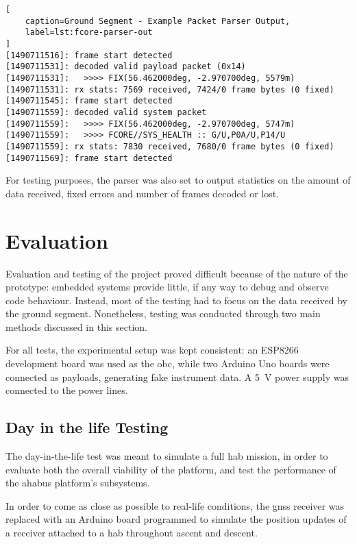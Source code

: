 \begin{lstlisting}[
    caption=Ground Segment - Example Packet Parser Output,
    label=lst:fcore-parser-out
]
[1490711516]: frame start detected
[1490711531]: decoded valid payload packet (0x14)
[1490711531]: 	>>>> FIX(56.462000deg, -2.970700deg, 5579m)
[1490711531]: rx stats: 7569 received, 7424/0 frame bytes (0 fixed)
[1490711545]: frame start detected
[1490711559]: decoded valid system packet
[1490711559]: 	>>>> FIX(56.462000deg, -2.970700deg, 5747m)
[1490711559]: 	>>>> FCORE//SYS_HEALTH :: G/U,P0A/U,P14/U
[1490711559]: rx stats: 7830 received, 7680/0 frame bytes (0 fixed)
[1490711569]: frame start detected
\end{lstlisting}

For testing purposes, the parser was also set to output statistics on the amount
of data received, fixed errors and number of frames decoded or lost.

\section{Evaluation}
\label{sec:testing}

Evaluation and testing of the project proved difficult because of the nature
of the prototype: embedded systems provide little, if any way to debug and
observe code behaviour. Instead, most of the testing had to focus on the data
received by the ground segment. Nonetheless, testing was conducted through
two main methods discussed in this section.

For all tests, the experimental setup was kept consistent: an ESP8266
development board was used as the \acrshort{obc}, while two Arduino Uno boards
were connected as payloads, generating fake instrument data. A \SI{5}{\volt}
power supply was connected to the power lines.

\subsection{Day in the life Testing}
\label{ssec:method-ditl}

The day-in-the-life test was meant to simulate a full \acrshort{hab} mission,
in order to evaluate both the overall viability of the platform, and test the
performance of the \acrshort{ahabus} platform's subsystems.

In order to come as close as possible to real-life conditions, the
\acrshort{gnss} receiver was replaced with an Arduino board programmed to
simulate the position updates of a receiver attached to a \acrlong{hab}
throughout ascent and descent.

